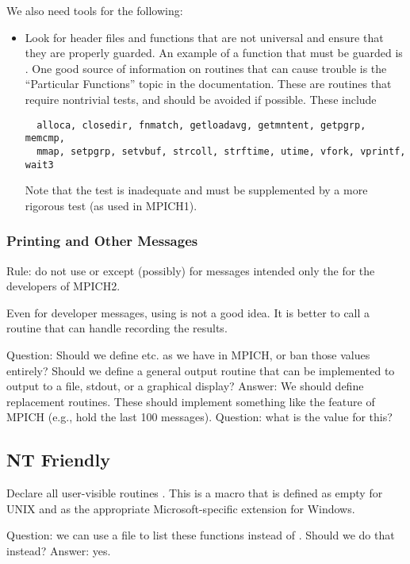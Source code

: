 \documentclass{article}
\begin{document}
We also need tools for the following:
\begin{itemize}
\item Look for header files and functions that are not universal and
  ensure that they are properly guarded.
  An example of a function that must be guarded is .
  One good source of information on routines that can cause trouble is the
  ``Particular Functions'' topic in the  documentation.  These
  are routines that require nontrivial tests, and should be avoided if
  possible.  These include
\begin{verbatim}
  alloca, closedir, fnmatch, getloadavg, getmntent, getpgrp, memcmp,
  mmap, setpgrp, setvbuf, strcoll, strftime, utime, vfork, vprintf, wait3
\end{verbatim}
Note that the  test is inadequate and must be supplemented
by a more rigorous test (as used in MPICH1).
\end{itemize}

\subsubsection{Printing and Other Messages}
Rule: do not use  or  except (possibly) for
messages intended only the for the developers of MPICH2.

Even for developer messages, using  is not a good idea.
It is better to call a routine that can handle recording the results.


Question: Should we define  etc. as we have in MPICH, or
ban those values entirely?  Should we define a general output routine
that can be implemented to output to a file, stdout, or a graphical display?
Answer: We should define replacement routines.  These should implement
something like the  feature of MPICH (e.g., hold the last 100
messages).  Question: what is the  value for this?

\subsection{NT Friendly}

Declare all user-visible routines .
This is a 
macro that is defined as empty for UNIX and as the appropriate
Microsoft-specific extension for Windows.

Question: we can use a file to list these functions instead of
.  Should we do that instead?  Answer: yes.
\end{document}
